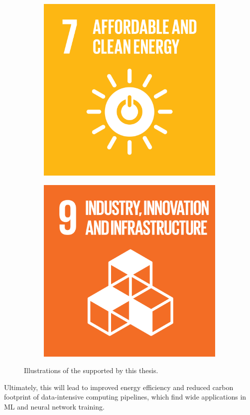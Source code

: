 \begin{figure}
    \centering
    \begin{subfigure}[b]{0.5\linewidth}
        \centering
        \includegraphics[width=0.6\linewidth]{figures/1-introduction/E_SDG_goals_icons-07.png} 
        \label{fig:sdg07}
    \end{subfigure}\hfill
    \begin{subfigure}[b]{0.5\linewidth}
        \centering
        \includegraphics[width=0.6\linewidth]{figures/1-introduction/E_SDG-goals_icons-09.png}
        \label{fig:sdg09}
	\end{subfigure}
	\caption[Sustainable Development Goals supported by this thesis]{Illustrations of the  supported by this thesis.}
	\label{fig:sdgs}
\end{figure}

Ultimately, this will lead to improved energy efficiency and reduced carbon footprint of data-intensive computing pipelines, which find wide applications in \gls{ML} and neural network training.
